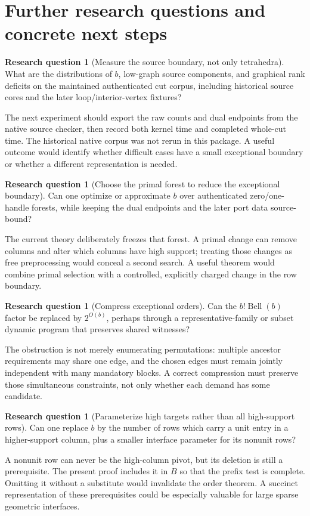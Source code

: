 \documentclass[11pt,letterpaper]{article}
\theoremstyle{definition}
\newtheorem{question}[theorem]{Research question}
\theoremstyle{remark}
\DeclareMathOperator{\Bell}{Bell}
\begin{document}
\section{Further research questions and concrete next steps}\label{sec:questions}
\begin{question}[Measure the source boundary, not only tetrahedra]
What are the distributions of $b$, low-graph source components, and graphical
rank deficits on the maintained authenticated cut corpus, including historical
source cores and the later loop/interior-vertex fixtures?
\end{question}
The next experiment should export the raw counts and dual endpoints from the
native source checker, then record both kernel time and completed whole-cut time.
The historical native corpus was not rerun in this package. A useful outcome would identify whether difficult cases have a
small exceptional boundary or whether a different representation is needed.

\begin{question}[Choose the primal forest to reduce the exceptional boundary]
Can one optimize or approximate $b$ over authenticated zero/one-handle forests,
while keeping the dual endpoints and the later port data source-bound?
\end{question}
The current theory deliberately freezes that forest. A primal change can remove
columns and alter which columns have high support; treating those changes as
free preprocessing would conceal a second search. A useful theorem would combine
primal selection with a controlled, explicitly charged change in the row boundary.

\begin{question}[Compress exceptional orders]
Can the $b!\Bell(b)$ factor be replaced by $2^{O(b)}$, perhaps through a
representative-family or subset dynamic program that preserves shared witnesses?
\end{question}
The obstruction is not merely enumerating permutations: multiple ancestor
requirements may share one edge, and the chosen edges must remain jointly
independent with many mandatory blocks. A correct compression must preserve those
simultaneous constraints, not only whether each demand has some candidate.

\begin{question}[Parameterize high targets rather than all high-support rows]
Can one replace $b$ by the number of rows which carry a unit entry in a
higher-support column, plus a smaller interface parameter for its nonunit rows?
\end{question}
A nonunit row can never be the high-column pivot, but its deletion is still a
prerequisite. The present proof includes it in $B$ so that the prefix test is
complete. Omitting it without a substitute would invalidate the order theorem.
A succinct representation of these prerequisites could be especially valuable
for large sparse geometric interfaces.
\end{document}
